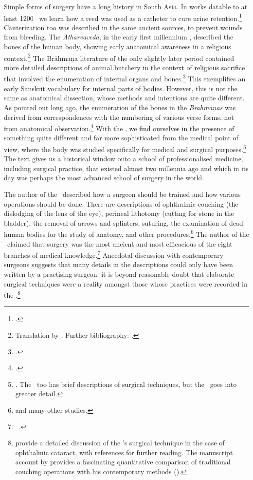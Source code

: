 Simple forms of surgery have a long history in South Asia. In works datable to at
least 1200 \BC\ we learn how a reed was used as a catheter to cure urine
retention.\footcite[70--71]{zysk-1985} Cauterization too was described in the same
ancient sources, to prevent wounds from bleeding. The \emph{Atharvaveda}, in the
early first millennium \BC, described the bones of the human body, showing early
anatomical awareness in a religious context.\footnote{Translation by \citet[\S43,
    \S100]{hoer-1907}. Further bibliography: \cite[IIB, 819]{meul-hist}.} The Brāhmaṇa
    literature of the only slightly later period contained more detailed descriptions
    of animal butchery in the context of religious sacrifice that involved the
    enumeration of internal organs and bones.\footcite{mala-1996,saha-2015}   This
    exemplifies an early Sanskrit vocabulary for internal parts of bodies.  However,
    this is not the same as anatomical dissection, whose methods and intentions are
    quite different. As \citeauthor{keit-1908} pointed out long ago, the enumeration
    of the bones in the \emph{Brāhmaṇas} was derived from correspondences with the
    numbering of various verse forms, not from anatomical
    observation.\footcite{keit-1908}  With the \SS, we find ourselves in the presence
    of something quite different and far more sophisticated from the medical point of
    view, where the body was studied specifically for medical and surgical
    purposes.\footnote{\cite{zysk-1986}. The \CS\ too has brief descriptions of
        surgical techniques, but the \SS\ goes into greater detail.} The text gives us a
        historical window onto a school of professionalised medicine, including surgical
        practice, that existed almost two millennia ago and which in its day was perhaps
        the most advanced school of surgery in the world.

The author of the \SS\ described how a surgeon should be trained and how various
operations should be done.  There are descriptions of ophthalmic couching (the
dislodging of the lens of the eye), perineal lithotomy (cutting for stone in the
bladder), the removal of arrows and splinters, suturing, the examination of dead
human bodies for the study of anatomy, and other
procedures.\footnote{\cites{mukh-1913,
    desh-2000,nara-2011,wuja-2003,wils-1823,vali-2007} and many other
    studies.} The author of the \SS\ claimed that
    surgery was the most ancient and most efficacious of the eight branches of medical
    knowledge.\footnote{\SS\ .} Anecdotal discussion with
        contemporary surgeons suggests that many details in the descriptions could only
        have been written by a practising surgeon: it is beyond reasonable doubt that
        elaborate surgical techniques were a reality amongst those whose practices were
        recorded in the \SS.\footnote{\cite{leff-2020} provide a detailed discussion of
            the \SS's surgical technique in the case of ophthalmic cataract, with references
            for further reading. The manuscript account by \citet{jack-1884} provides a
            fascinating quantitative comparison of traditional couching operations with his
            contemporary methods ().}

